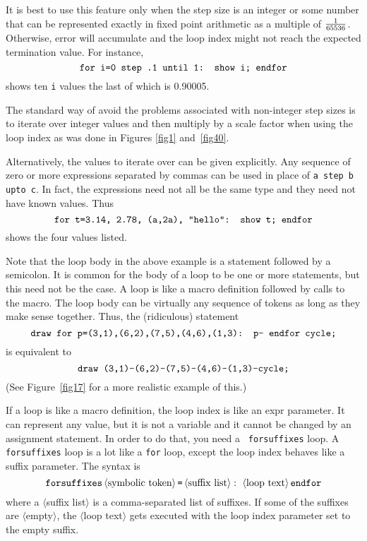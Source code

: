 \documentclass{article} %
\newcommand\descr[1]{{\langle\hbox{#1}\rangle}}
\newcommand\invisgap{\nobreak\hskip0pt\relax}
\newcommand\tdescr[1]{$\langle$\invisgap#1\invisgap$\rangle$}
\begin{document}
It is best to use this feature only when the step size is an integer or
some number that can be represented exactly in fixed point
arithmetic as a multiple of $1\over65536$.  Otherwise,
error will accumulate and the loop index might not reach the expected
termination value.  For instance,
$$ \hbox{\tt for i=0 step .1 until 1: show i; endfor} $$
shows ten {\tt i} values the last of which is 0.90005.

The standard way of avoid the problems associated with non-integer step
sizes is to iterate over integer values and then multiply by a scale
factor when using the loop index as was done in Figures \ref{fig1}
and~\ref{fig40}.

Alternatively, the values to iterate over can be given explicitly.  Any
sequence of zero or more expressions separated by commas can be used in
place of {\tt a step b upto c}.  In fact, the expressions need not all
be the same type and they need not have known values.  Thus
$$ \hbox{\tt for t=3.14, 2.78, (a,2a), "hello": show t; endfor} $$
shows the four values listed.

Note that the loop body in the above example is a statement followed by a
semicolon.  It is common for the body of a loop to be one or more statements,
but this need not be the case.  A loop is like a macro definition followed by
calls to the macro.  The loop body can be virtually any sequence of tokens as
long as they make sense together.  Thus, the (ridiculous) statement
$$ \hbox{\tt draw for p=(3,1),(6,2),(7,5),(4,6),(1,3): p-- endfor cycle;} $$
is equivalent to
$$ \hbox{\tt draw (3,1)--(6,2)--(7,5)--(4,6)--(1,3)--cycle;} $$
(See Figure~\ref{fig17} for a more realistic example of this.)

If a loop is like a macro definition, the loop index is like an expr
parameter.  It can represent any value, but it is
not a variable and it cannot be changed by an assignment
statement.  In order to do that, you need a {\tt
forsuffixes} loop.  A {\tt
forsuffixes} loop is a lot like a {\tt for} loop, except the loop index
behaves like a suffix parameter.  The syntax is
$$ {\tt forsuffixes}\, \descr{symbolic token}\, \hbox{\tt =}\,
   \descr{suffix list}:\ \descr{loop text}\, {\tt endfor}
$$
where a \tdescr{suffix list} is a comma-separated list of suffixes.  If
some of the suffixes are \tdescr{empty}, the \tdescr{loop text} gets
executed with the loop index parameter set to the empty suffix.
\end{document}
